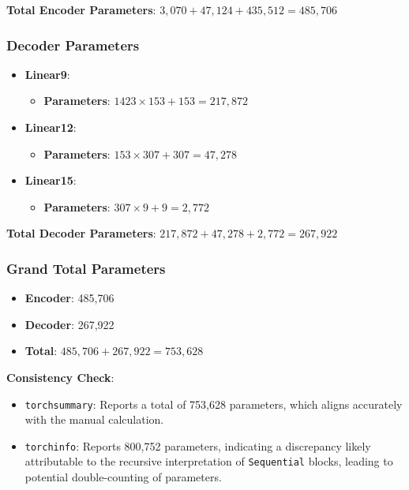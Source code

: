 \documentclass[10pt]{article}
\begin{document}
\textbf{Total Encoder Parameters}: \( 3,070 + 47,124 + 435,512 = 485,706 \)

\subsubsection{Decoder Parameters}

\begin{itemize}
    \item \textbf{Linear9}:
    \begin{itemize}
        \item \textbf{Parameters}: \( 1423 \times 153 + 153 = 217,872 \)
    \end{itemize}
    
    \item \textbf{Linear12}:
    \begin{itemize}
        \item \textbf{Parameters}: \( 153 \times 307 + 307 = 47,278 \)
    \end{itemize}
    
    \item \textbf{Linear15}:
    \begin{itemize}
        \item \textbf{Parameters}: \( 307 \times 9 + 9 = 2,772 \)
    \end{itemize}
\end{itemize}

\textbf{Total Decoder Parameters}: \( 217,872 + 47,278 + 2,772 = 267,922 \)

\subsubsection{Grand Total Parameters}

\begin{itemize}
    \item \textbf{Encoder}: 485,706
    \item \textbf{Decoder}: 267,922
    \item \textbf{Total}: \( 485,706 + 267,922 = 753,628 \)
\end{itemize}

\textbf{Consistency Check}:

\begin{itemize}
    \item \texttt{torchsummary}: Reports a total of 753,628 parameters, which aligns accurately with the manual calculation.
    \item \texttt{torchinfo}: Reports 800,752 parameters, indicating a discrepancy likely attributable to the recursive interpretation of \texttt{Sequential} blocks, leading to potential double-counting of parameters.
\end{itemize}
\end{document}
